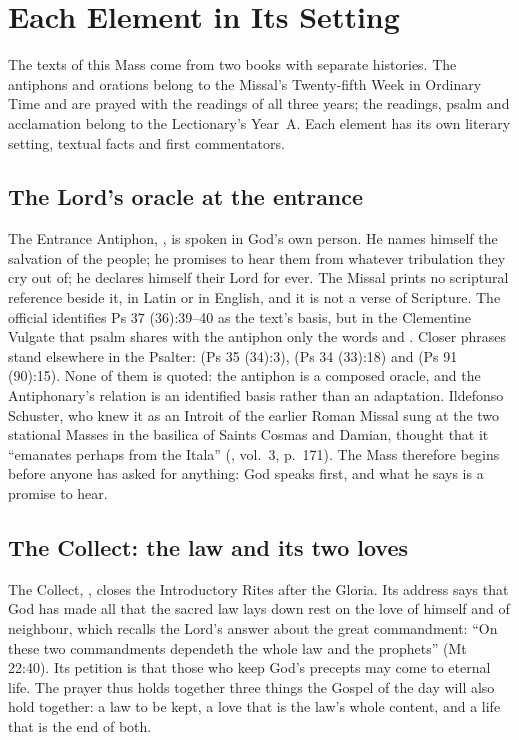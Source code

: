 \section{Each Element in Its Setting}
\label{sec:each-element}

The texts of this Mass come from two books with separate histories. The
antiphons and orations belong to the Missal's Twenty-fifth Week in Ordinary
Time and are prayed with the readings of all three years; the readings, psalm
and acclamation belong to the Lectionary's Year~A. Each element has its own
literary setting, textual facts and first commentators.

\subsection{The Lord's oracle at the entrance}

The Entrance Antiphon, , is spoken
in God's own person. He names himself the salvation of the people; he promises
to hear them from whatever tribulation they cry out of; he declares himself
their Lord for ever. The Missal prints no scriptural reference beside it, in
Latin or in English, and it is not a verse of Scripture. The official
 identifies Ps 37 (36):39--40 as the text's basis, but in the
Clementine Vulgate that psalm shares with
the antiphon only the words  and . Closer
phrases stand elsewhere in the Psalter:  (Ps 35
(34):3),  (Ps 34 (33):18) and  (Ps 91 (90):15). None of them is quoted: the antiphon is
a composed oracle, and the Antiphonary's relation is an identified basis rather
than an adaptation. Ildefonso Schuster, who knew it as an Introit of the earlier Roman
Missal sung at the two stational Masses in the basilica of Saints Cosmas and
Damian, thought that it ``emanates perhaps from the Itala'' (, vol.~3, p.~171). The Mass therefore
begins before anyone has asked for anything: God speaks first, and what he
says is a promise to hear.

\subsection{The Collect: the law and its two loves}

The Collect, , closes the
Introductory Rites after the Gloria. Its address says that God has made all
that the sacred law lays down rest on the love of himself and of neighbour,
which recalls the Lord's answer about the great commandment: ``On these two
commandments dependeth the whole law and the prophets'' (Mt 22:40). Its
petition is that those who keep God's precepts may come to eternal life. The
prayer thus holds together three things the Gospel of the day will also hold
together: a law to be kept, a love that is the law's whole content, and a life
that is the end of both.

